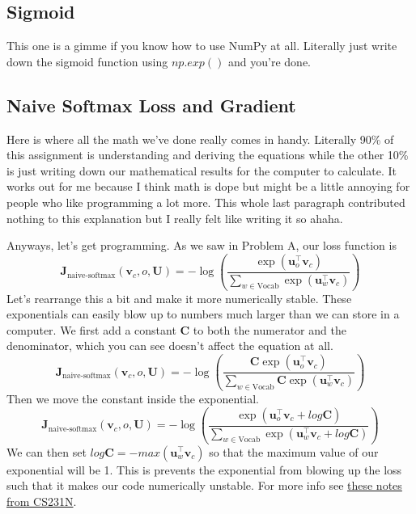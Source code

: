\documentclass[12pt]{article}
\begin{document}
\subsection{Sigmoid}
This one is a gimme if you know how to use NumPy at all. Literally just write down the sigmoid function 
using $np.exp()$ and you're done. 

\subsection{Naive Softmax Loss and Gradient}
Here is where all the math we've done really comes in handy. Literally 90\% of this assignment is 
understanding and deriving the equations while the other 10\% is just writing down our 
mathematical results for the computer to calculate. It works out for me because I think math is dope 
but might be a little annoying for people who like programming a lot more. This whole last paragraph 
contributed nothing to this explanation but I really felt like writing it so ahaha. 

Anyways, let's get programming. As we saw in Problem A, our loss function is
\begin{equation*} 
    \bm J_{\text{naive-softmax}}(\bm v_c, o, \bm U) = 
    - \log(\frac{\exp(\bm u_o^\top \bm v_c)}{\sum_{w \in \text{Vocab}} \exp(\bm u_{w}^\top \bm v_c)})
\end{equation*} 
Let's rearrange this a bit and make it more numerically stable. These exponentials can easily blow up 
to numbers much larger than we can store in a computer. We first add a constant $\bm C$ to both 
the numerator and the denominator, which you can see doesn't affect the equation at all.
\begin{equation*} 
    \bm J_{\text{naive-softmax}}(\bm v_c, o, \bm U) = 
    - \log(\frac{\bm C \exp(\bm u_o^\top \bm v_c)}{ \sum_{w \in \text{Vocab}} \bm C \exp(\bm u_{w}^\top \bm v_c)})
\end{equation*} 
Then we move the constant inside the exponential. 
\begin{equation*} 
    \bm J_{\text{naive-softmax}}(\bm v_c, o, \bm U) = 
    - \log(\frac{\exp(\bm u_o^\top \bm v_c + log \bm C)}{\sum_{w \in \text{Vocab}} \exp(\bm u_{w}^\top \bm v_c + log \bm C)})
\end{equation*} 
We can then set $log \bm C = - max(\bm u_w^\top \bm v_c)$ so that the maximum value of our 
exponential will be 1. This is prevents the exponential from blowing up the loss such that 
it makes our code numerically unstable. For more info see 
\href{https://cs231n.github.io/linear-classify/#softmax-classifier}{these notes from CS231N}. 
\end{document}
